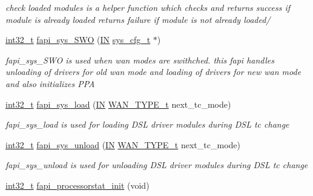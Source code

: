 \begin{DoxyCompactItemize}
\begin{DoxyCompactList}\small\item\em check loaded modules is a helper function which checks and returns success if module is already loaded returns failure if module is not already loaded/ \end{DoxyCompactList}\item 
\hyperlink{commondefs_8h_a32f2e37ee053cf2ce8ca28d1f74630e5}{int32\-\_\-t} \hyperlink{group__FAPI__SYSTEM_ga911be523637239d85d00ba9063ac2658}{fapi\-\_\-sys\-\_\-\-S\-W\-O} (\hyperlink{group__LIBHELP_gac2bbd6d630a06a980d9a92ddb9a49928}{I\-N} \hyperlink{group__FAPI__SYSTEM_ga67fc6ffc6cd31f4651e4354a82f894bd}{sys\-\_\-cfg\-\_\-t} $\ast$)
\begin{DoxyCompactList}\small\item\em fapi\-\_\-sys\-\_\-\-S\-W\-O is used when wan modes are swithched. this fapi handles unloading of drivers for old wan mode and loading of drivers for new wan mode and also initializes P\-P\-A \end{DoxyCompactList}\item 
\hyperlink{commondefs_8h_a32f2e37ee053cf2ce8ca28d1f74630e5}{int32\-\_\-t} \hyperlink{group__FAPI__SYSTEM_ga47cc91060f98a17618f39c80ad56f1f8}{fapi\-\_\-sys\-\_\-load} (\hyperlink{group__LIBHELP_gac2bbd6d630a06a980d9a92ddb9a49928}{I\-N} \hyperlink{group__FAPI__SYSTEM_ga3ad40ceee4008665be22b54298c37de0}{W\-A\-N\-\_\-\-T\-Y\-P\-E\-\_\-t} next\-\_\-tc\-\_\-mode)
\begin{DoxyCompactList}\small\item\em fapi\-\_\-sys\-\_\-load is used for loading D\-S\-L driver modules during D\-S\-L tc change \end{DoxyCompactList}\item 
\hyperlink{commondefs_8h_a32f2e37ee053cf2ce8ca28d1f74630e5}{int32\-\_\-t} \hyperlink{group__FAPI__SYSTEM_ga45e343d700433fc91cbfc405702d37c7}{fapi\-\_\-sys\-\_\-unload} (\hyperlink{group__LIBHELP_gac2bbd6d630a06a980d9a92ddb9a49928}{I\-N} \hyperlink{group__FAPI__SYSTEM_ga3ad40ceee4008665be22b54298c37de0}{W\-A\-N\-\_\-\-T\-Y\-P\-E\-\_\-t} next\-\_\-tc\-\_\-mode)
\begin{DoxyCompactList}\small\item\em fapi\-\_\-sys\-\_\-unload is used for unloading D\-S\-L driver modules during D\-S\-L tc change \end{DoxyCompactList}\item 
\hyperlink{commondefs_8h_a32f2e37ee053cf2ce8ca28d1f74630e5}{int32\-\_\-t} \hyperlink{group__FAPI__SYSTEM_gaa4fe6c3ae5b8815c780168328cd40ac4}{fapi\-\_\-processorstat\-\_\-init} (void)

\end{DoxyCompactItemize}
